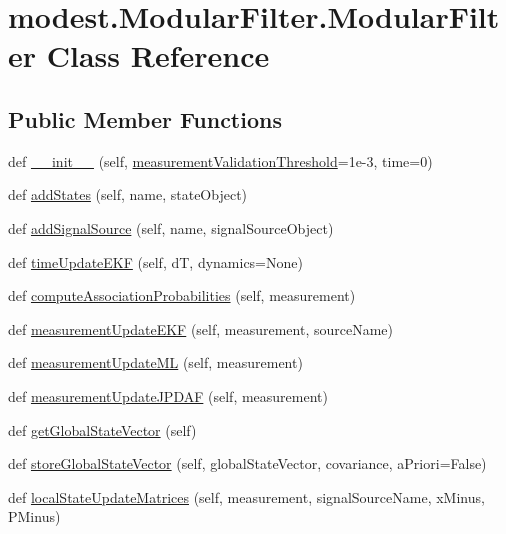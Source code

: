 \hypertarget{classmodest_1_1ModularFilter_1_1ModularFilter}{}\section{modest.\+Modular\+Filter.\+Modular\+Filter Class Reference}
\label{classmodest_1_1ModularFilter_1_1ModularFilter}
\subsection*{Public Member Functions}
\begin{DoxyCompactItemize}
\item 
def \hyperlink{classmodest_1_1ModularFilter_1_1ModularFilter_acf229829426859ffa1d5c0b64e027b69}{\+\_\+\+\_\+init\+\_\+\+\_\+} (self, \hyperlink{classmodest_1_1ModularFilter_1_1ModularFilter_ae3903876f8bd6b45e7630c53e126b29c}{measurement\+Validation\+Threshold}=1e-\/3, time=0)
\item 
def \hyperlink{classmodest_1_1ModularFilter_1_1ModularFilter_a06ff9fc8ac0437d7e4be7bb1b02b545a}{add\+States} (self, name, state\+Object)
\item 
def \hyperlink{classmodest_1_1ModularFilter_1_1ModularFilter_a75140e1dc2885163912af2d131326eed}{add\+Signal\+Source} (self, name, signal\+Source\+Object)
\item 
def \hyperlink{classmodest_1_1ModularFilter_1_1ModularFilter_af6c3f6c48c9966b6cacc78b751f3e32b}{time\+Update\+E\+KF} (self, dT, dynamics=None)
\item 
def \hyperlink{classmodest_1_1ModularFilter_1_1ModularFilter_a1165a742481390928f29f9bd7d1f7588}{compute\+Association\+Probabilities} (self, measurement)
\item 
def \hyperlink{classmodest_1_1ModularFilter_1_1ModularFilter_aab423f4ba75b9f07992de08666409440}{measurement\+Update\+E\+KF} (self, measurement, source\+Name)
\item 
def \hyperlink{classmodest_1_1ModularFilter_1_1ModularFilter_a06288fc0e2ec0bd6761e388d401a6590}{measurement\+Update\+ML} (self, measurement)
\item 
def \hyperlink{classmodest_1_1ModularFilter_1_1ModularFilter_a4b0f2e5f83c580d58264595d0750a3c6}{measurement\+Update\+J\+P\+D\+AF} (self, measurement)
\item 
def \hyperlink{classmodest_1_1ModularFilter_1_1ModularFilter_a9795cd8e707f60310a98189caaa5d340}{get\+Global\+State\+Vector} (self)
\item 
def \hyperlink{classmodest_1_1ModularFilter_1_1ModularFilter_a07add84bbb65cc888554817af50516f2}{store\+Global\+State\+Vector} (self, global\+State\+Vector, covariance, a\+Priori=False)
\item 
def \hyperlink{classmodest_1_1ModularFilter_1_1ModularFilter_a344b552e70fd11dfdf69153f291f503e}{local\+State\+Update\+Matrices} (self, measurement, signal\+Source\+Name, x\+Minus, P\+Minus)
\end{DoxyCompactItemize}
